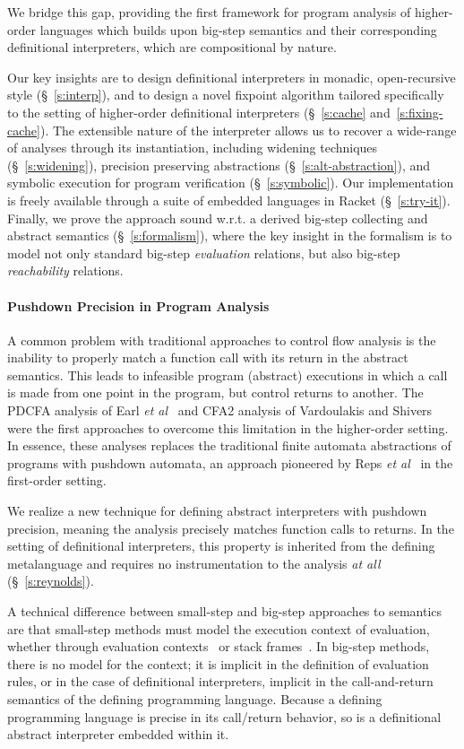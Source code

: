 We bridge this gap, providing the first framework for program analysis of
higher-order languages which builds upon big-step semantics and their
corresponding definitional interpreters, which are compositional by nature. 

Our key insights are to design definitional interpreters in monadic,
open-recursive style (§~\ref{s:interp}), and to design a
novel fixpoint algorithm tailored specifically to the setting of higher-order
definitional interpreters (§~\ref{s:cache} and~\ref{s:fixing-cache}). The
extensible nature of the interpreter allows us to recover a wide-range of
analyses through its instantiation, including widening techniques
(§~\ref{s:widening}), precision preserving abstractions
(§~\ref{s:alt-abstraction}), and symbolic execution for program verification
(§~\ref{s:symbolic}). Our implementation is freely available through a suite of
embedded languages in Racket (§~\ref{s:try-it}). Finally, we prove the approach
sound w.r.t. a derived big-step collecting and abstract semantics
(§~\ref{s:formalism}), where the key insight in the formalism is to model not
only standard big-step \emph{evaluation} relations, but also big-step
\emph{reachability} relations.

\paragraph{Pushdown Precision in Program Analysis}
A common problem with traditional approaches to control flow analysis is the
inability to properly match a function call with its return in the abstract
semantics. This leads to infeasible program (abstract) executions in which a
call is made from one point in the program, but control returns to another.
The PDCFA analysis of Earl \emph{et al}~\cite{dvanhorn:Earl2010Pushdown} and
CFA2 analysis of Vardoulakis and Shivers~\cite{dvanhorn:Vardoulakis2011CFA2}
were the first approaches to overcome this limitation in the higher-order
setting. In essence, these analyses replaces the traditional finite automata
abstractions of programs with pushdown automata, an approach pioneered by Reps
\emph{et al}~\cite{dvanhorn:Reps1995Precise} in the first-order setting.

We realize a new technique for defining abstract interpreters with pushdown
precision, meaning the analysis precisely matches function calls to returns. In
the setting of definitional interpreters, this property is inherited from the
defining metalanguage and requires no instrumentation to the analysis \emph{at
all} (§~\ref{s:reynolds}).

A technical difference between small-step and big-step approaches to semantics
are that small-step methods must model the execution context of evaluation,
whether through evaluation contexts~\cite{local:felleisen-TCS1992} or stack
frames~\cite{dvanhorn:Felleisen1987Calculus}. In big-step methods, there is no
model for the context; it is implicit in the definition of evaluation rules, or
in the case of definitional interpreters, implicit in the call-and-return
semantics of the defining programming language. Because a defining programming
language is precise in its call/return behavior, so is a definitional abstract
interpreter embedded within it.
